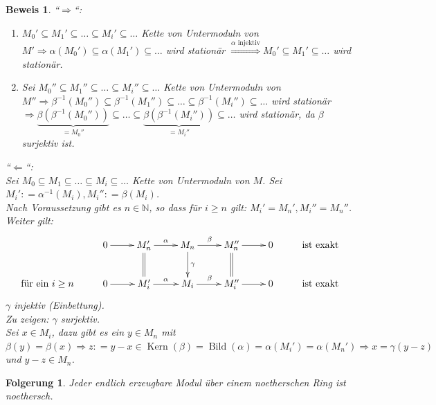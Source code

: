 \documentclass[a4paper,12pt]{scrbook}
\theoremstyle{break}
\newtheorem{Folg}[Def]{Folgerung}
\theoremstyle{nonumberbreak}
\newtheorem{Bew}{Beweis}
\theoremstyle{nonumberplain}
\newcommand{\defeqr}[0]{\mathrel{\mathop:}=}
\DeclareMathOperator{\Kern}{Kern}
\DeclareMathOperator{\Bild}{Bild}
\begin{document}
\begin{Bew} 
  ``$\Rightarrow$``:
  \begin{enumerate}
    \item[(i)] $M_0' \subseteq M_1' \subseteq \dots  \subseteq M_i' \subseteq
               \dots$ Kette von Untermoduln von $M' \Rightarrow \alpha(M_0')
               \subseteq \alpha(M_1') \subseteq \dots$ wird stationär
               $\overset{\alpha \text{ injektiv}}{\Longrightarrow} M_0'
               \subseteq M_1' \subseteq \dots$ wird stationär.
    \item[(ii)] Sei $M_0'' \subseteq M_1'' \subseteq \dots \subseteq M_i''
                \subseteq \dots$ Kette von Untermoduln von $M'' \Rightarrow
                \beta^{-1}(M_0'') \subseteq \beta^{-1}(M_1'') \subseteq \dots
                \subseteq \beta^{-1}(M_i'') \subseteq \dots$ wird stationär
                $\Rightarrow \underset{= M_0''
                }{\underbrace{\beta(\beta^{-1}(M_0''))}} \subseteq \dots \subseteq
                \underset{=M_i''}{\underbrace{\beta(\beta^{-1}(M_i''))}}
                \subseteq \dots$ wird stationär, da $\beta$ surjektiv ist.
  \end{enumerate}
  ``$\Leftarrow$``:\\
  Sei $M_0 \subseteq M_1 \subseteq \dots \subseteq M_i \subseteq \dots$
  Kette von Untermoduln von $M$. Sei $M_i' \defeqr \alpha^{-1}(M_i), M_i''
  \defeqr \beta(M_i)$.\\
  Nach Voraussetzung gibt es $n \in \mathbb{N}$, so dass für $i \ge n$ gilt:
  $M_i' = M_n', M_i'' = M_n''$. Weiter gilt:
  \[
  \begin{xy}
    \xymatrix{
      & 0 \ar@{->}[r] & M_n' \ar@{=}[d] \ar@{->}[r]^{\alpha} & M_n
      \ar@{->}[d]^{\gamma}
      \ar@{->}[r]^{\beta} & M_n''  \ar@{=}[d] \ar@{->}[r] & 0 & \mbox{ist exakt}\\
      \mbox{für ein } i \ge n& 0  \ar@{->}[r] & M_i' \ar@{->}[r]^{\alpha} & M_i
      \ar@{->}[r]^{\beta} & M_i'' \ar@{->}[r] & 0 &
      \mbox{ist exakt}}
  \end{xy}\]
  $\gamma$ injektiv (Einbettung).\\
  Zu zeigen: $\gamma$ surjektiv.\\
  Sei $x \in M_i$, dazu gibt es ein $y \in M_n$ mit $\beta(y) = \beta(x)
  \Rightarrow z \defeqr y-x \in \Kern(\beta) = \Bild(\alpha)
  = \alpha(M_i') = \alpha(M_n') \Rightarrow x = \gamma(y - z)$ und $y-z \in M_n$.
\end{Bew}

\begin{Folg}
\label{2.3}
  Jeder endlich erzeugbare Modul über einem noetherschen Ring ist noethersch.
\end{Folg}
\end{document}
